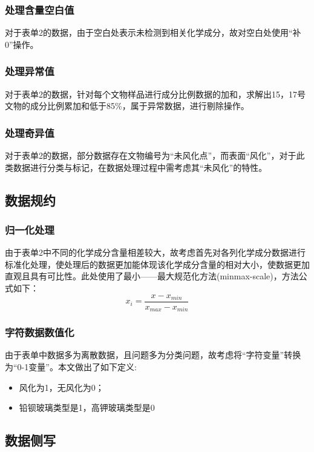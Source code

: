 \documentclass[withoutpreface,bwprint]{cumcmthesis} %
\begin{document}
\subsubsection{处理含量空白值}

对于表单2的数据，由于空白处表示未检测到相关化学成分，故对空白处使用“补0”操作。

\subsubsection{处理异常值}

对于表单2的数据，针对每个文物样品进行成分比例数据的加和，求解出15，17号文物的成分比例累加和低于85\%，属于异常数据，进行剔除操作。

\subsubsection{处理奇异值}

对于表单2的数据，部分数据存在文物编号为“未风化点”，而表面“风化”，对于此类数据进行分类与标记，在数据处理过程中需考虑其“未风化”的特性。


\subsection{数据规约}
\subsubsection{归一化处理}
由于表单2中不同的化学成分含量相差较大，故考虑首先对各列化学成分数据进行标准化处理，使处理后的数据更加能体现该化学成分含量的相对大小，使数据更加直观且具有可比性。此处使用了最小——最大规范化方法(minmax-scale)，方法公式如下： $$ x_{i} = \frac{x-x_{min}}{x_{max}-x_{min}}$$

\subsubsection{字符数据数值化}

由于表单中数据多为离散数据，且问题多为分类问题，故考虑将“字符变量”转换为“0-1变量”。本文做出了如下定义:

\begin{itemize}
	\item 风化为1，无风化为0；
	\item 铅钡玻璃类型是1，高钾玻璃类型是0
\end{itemize}

\subsection{数据侧写}
\end{document}
